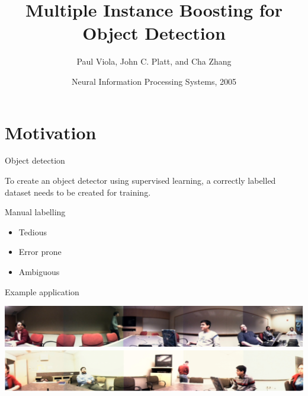 \documentclass{beamer}
\title{Multiple Instance Boosting for Object Detection}
\author{Paul Viola, John C. Platt, and Cha Zhang}
\institute{Microsoft Research}
\date{Neural Information Processing Systems, 2005}
\begin{document}
	\maketitle

	\section{Motivation}
	
	\begin{frame}{Object detection}
		\begin{center}
			
			To create an object detector using supervised learning, a correctly
			labelled dataset needs to be created for training.

		\end{center}
	\end{frame}

	
	\begin{frame}{Manual labelling}

		\begin{itemize}
			\item Tedious
			\item Error prone
			\item Ambiguous
		\end{itemize}

			
			

	\end{frame}

	\begin{frame}{Example application}
		\begin{center}
			\includegraphics[width=1\textwidth]{input-1.png} \\
			\includegraphics[width=1\textwidth]{input-2.png}
		\end{center}
	\end{frame}
\end{document}
